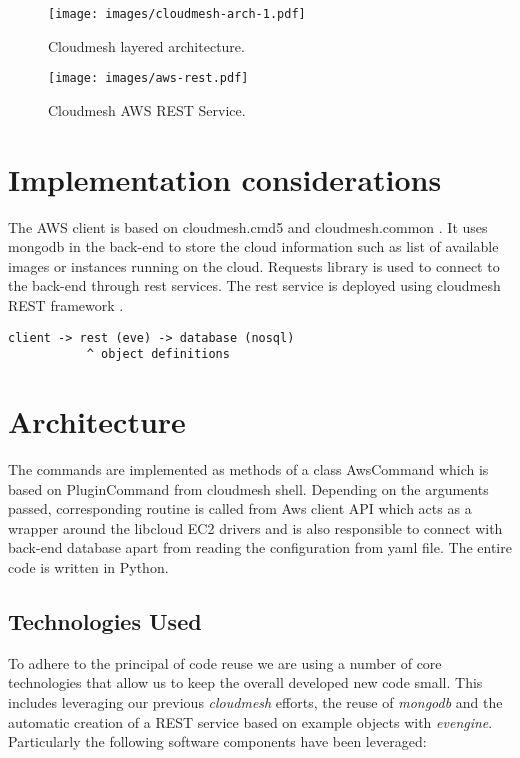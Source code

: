 \documentclass[9pt,twocolumn,twoside]{../../styles/osajnl}
\begin{document}
\begin{figure}[htb]
  \centering
     \texttt{[image: images/cloudmesh-arch-1.pdf]}
  \caption{Cloudmesh layered architecture.} 
  \label{F:NIST-arch}
\end{figure}

\begin{figure}[htb]
  \centering
     \texttt{[image: images/aws-rest.pdf]}
  \caption{Cloudmesh AWS REST Service.} 
  \label{F:NIST-arch}
\end{figure}



\section{Implementation considerations}

The AWS client is based on cloudmesh.cmd5 \cite{www-cloudmesh-cmd5}
and cloudmesh.common \cite{www-cloudmesh-common}. It uses mongodb in
the back-end to store the cloud information such as list of available
images or instances running on the cloud. Requests library
\cite{www-python-requests} is used to connect to the back-end through
rest services. The rest service is deployed using cloudmesh REST
framework \cite{www-cloudmesh-rest}.

\begin{verbatim}
client -> rest (eve) -> database (nosql)
           ^ object definitions
\end{verbatim}

\section{Architecture}

The commands are implemented as methods of a class AwsCommand which is
based on PluginCommand from cloudmesh shell. Depending on the
arguments passed, corresponding routine is called from Aws client API
which acts as a wrapper around the libcloud EC2 drivers
\cite{www-libcloud-ec2} and is also responsible to connect with
back-end database apart from reading the configuration from yaml
file. The entire code is written in Python.

\subsection{Technologies Used}

To adhere to the principal of code reuse we are using a number of core
technologies that allow us to keep the overall developed new code
small. This includes leveraging our previous {\it cloudmesh} efforts, the
reuse of {\it mongodb} and the automatic creation of a REST service based
on example objects with {\it evengine}. Particularly the following
software components have been leveraged:
\end{document}
